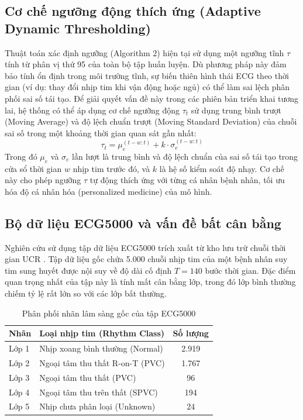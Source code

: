 \documentclass[conference]{IEEEtran}
\begin{document}
\subsection{Cơ chế ngưỡng động thích ứng (Adaptive Dynamic Thresholding)}
Thuật toán xác định ngưỡng (Algorithm 2) hiện tại sử dụng một ngưỡng tĩnh $\tau$ tính từ phân vị thứ 95 của toàn bộ tập huấn luyện. Dù phương pháp này đảm bảo tính ổn định trong môi trường tĩnh, sự biến thiên hình thái ECG theo thời gian (ví dụ: thay đổi nhịp tim khi vận động hoặc ngủ) có thể làm sai lệch phân phối sai số tái tạo. 
Để giải quyết vấn đề này trong các phiên bản triển khai tương lai, hệ thống có thể áp dụng cơ chế ngưỡng động $\tau_t$ sử dụng trung bình trượt (Moving Average) và độ lệch chuẩn trượt (Moving Standard Deviation) của chuỗi sai số trong một khoảng thời gian quan sát gần nhất:
\begin{equation}
\tau_t = \mu_e^{(t-w:t)} + k \cdot \sigma_e^{(t-w:t)}
\end{equation}
Trong đó $\mu_e$ và $\sigma_e$ lần lượt là trung bình và độ lệch chuẩn của sai số tái tạo trong cửa sổ thời gian $w$ nhịp tim trước đó, và $k$ là hệ số kiểm soát độ nhạy. Cơ chế này cho phép ngưỡng $\tau$ tự động thích ứng với từng cá nhân bệnh nhân, tối ưu hóa độ cá nhân hóa (personalized medicine) của mô hình.

\subsection{Bộ dữ liệu ECG5000 và vấn đề bất cân bằng}
Nghiên cứu sử dụng tập dữ liệu ECG5000 trích xuất từ kho lưu trữ chuỗi thời gian UCR \cite{ucr}. Tập dữ liệu gốc chứa 5.000 chuỗi nhịp tim của một bệnh nhân suy tim sung huyết được nội suy về độ dài cố định \(T=140\) bước thời gian. Đặc điểm quan trọng nhất của tập này là tính mất cân bằng lớp, trong đó lớp bình thường chiếm tỷ lệ rất lớn so với các lớp bất thường.

\begin{table}[htbp]
\caption{Phân phối nhãn lâm sàng gốc của tập ECG5000}
\centering
\begin{tabular}{llc}
\toprule
\textbf{Nhãn} & \textbf{Loại nhịp tim (Rhythm Class)} & \textbf{Số lượng} \\
\midrule
Lớp 1 & Nhịp xoang bình thường (Normal) & 2.919 \\
Lớp 2 & Ngoại tâm thu thất R-on-T (PVC) & 1.767 \\
Lớp 3 & Ngoại tâm thu thất (PVC) & 96 \\
Lớp 4 & Ngoại tâm thu trên thất (SPVC) & 194 \\
Lớp 5 & Nhịp chưa phân loại (Unknown) & 24 \\
\bottomrule
\end{tabular}
\label{tab:dataset_raw}
\end{table}
\end{document}
